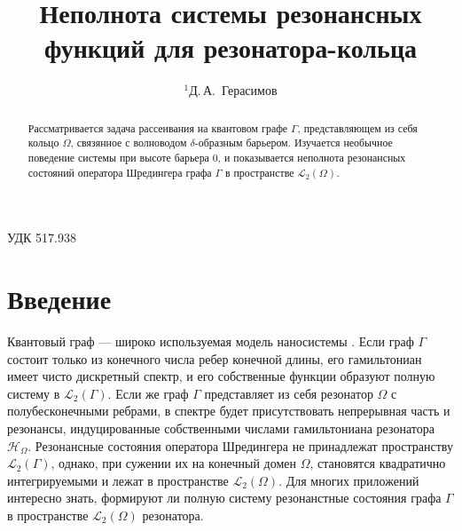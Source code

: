 \documentclass{nsart_eng}
\newcommand{\mcL}{\mathcal{L}}
\newcommand{\mcH}{\mathcal{H}}
\begin{document}
\title[Неполнота системы резонансных функций для резонатора-кольца]
{Неполнота системы резонансных функций для резонатора-кольца}

\author[Д.\,А.~Герасимов]
{$^1$Д.\,А.~Герасимов}

\address{
$^1$ Санкт-Петербургский Национальный Исследовательский Университет Информационных Технологий, \\
Механики и Оптики,\\
Кронверкский пр., 49, Санкт-Петербург, 197101, Россия}


УДК 517.938

\begin{abstract}
Рассматривается задача рассеивания на квантовом графе $\Gamma$, представляющем из себя кольцо $\Omega$, связянное с волноводом $\delta$-образным барьером. Изучается необычное поведение системы при высоте барьера 0, и показывается неполнота резонансных состояний оператора Шредингера графа $\Gamma$ в пространстве $\mcL_2(\Omega)$.
\end{abstract}


\maketitle

\section{Введение}

Квантовый граф — широко используемая модель наносистемы \cite{1, 2, 3, 4}. Если граф $\Gamma$ состоит только из конечного числа ребер конечной длины, его гамильтониан имеет чисто дискретный спектр, и его собственные функции образуют полную систему в $\mcL_2(\Gamma)$. Если же граф $\Gamma$ представляет из себя резонатор $\Omega$ с полубесконечными ребрами, в спектре будет присутствовать непрерывная часть и резонансы, индуцированные собственными числами гамильтониана резонатора $\mcH_\Omega$. Резонансные состояния оператора Шредингера не принадлежат пространству $\mcL_2(\Gamma)$, однако, при сужении их на конечный домен $\Omega$, становятся квадратично интегрируемыми и лежат в пространстве $\mcL_2(\Omega)$. Для многих приложений интересно знать, формируют ли полную систему резонанстные состояния графа $\Gamma$ в пространстве $\mcL_2(\Omega)$ резонатора.
\end{document}
